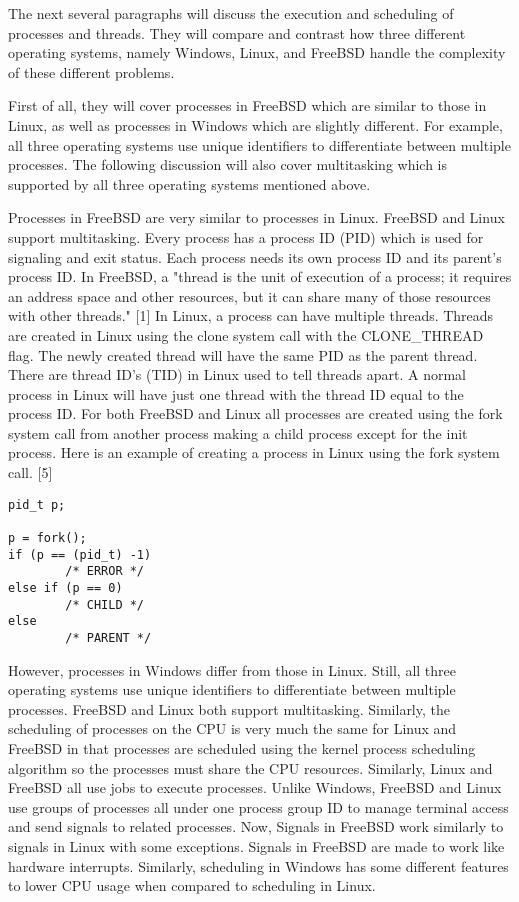 \documentclass[letterpaper,10pt,draftclsnofoot,onecolumn,]{IEEEtran}
\begin{document}

The next several paragraphs will discuss the execution and scheduling of processes and threads. They will compare and contrast how three different operating systems, namely Windows, Linux, and FreeBSD handle the complexity of these different problems. 

First of all, they will cover processes in FreeBSD which are similar to those in Linux, as well as processes in Windows which are slightly different. For example, all three operating systems use unique identifiers to differentiate between multiple processes. The following discussion will also cover multitasking which is supported by all three operating systems mentioned above.

Processes in FreeBSD are very similar to processes in Linux. FreeBSD and Linux support multitasking. Every process has a process ID (PID) which is used for signaling and exit status. Each process needs its own process ID and its parent's process ID. In FreeBSD, a "thread is the unit of execution of a process; it requires an address space and other resources, but it can share many of those resources with other threads." [1] In Linux, a process can have multiple threads. Threads are created in Linux using the clone system call with the CLONE\_THREAD flag. The newly created thread will have the same PID as the parent thread. There are thread ID's (TID) in Linux used to tell threads apart. A normal process in Linux will have just one thread with the thread ID equal to the process ID. For both FreeBSD and Linux all processes are created using the fork system call from another process making a child process except for the init process. Here is an example of creating a process in Linux using the fork system call. [5] 
\begin{lstlisting}
pid_t p;

p = fork();
if (p == (pid_t) -1)
        /* ERROR */
else if (p == 0)
        /* CHILD */
else
        /* PARENT */
\end{lstlisting}

However, processes in Windows differ from those in Linux. Still, all three operating systems use unique identifiers to differentiate between multiple processes. FreeBSD and Linux both support multitasking. Similarly, the scheduling of processes on the CPU is very much the same for Linux and FreeBSD in that processes are scheduled using the kernel process scheduling algorithm so the processes must share the CPU resources. Similarly, Linux and FreeBSD all use jobs to execute processes. Unlike Windows, FreeBSD and Linux use groups of processes all under one process group ID to manage terminal access and send signals to related processes. Now, Signals in FreeBSD work similarly to signals in Linux with some exceptions. Signals in FreeBSD are made to work like hardware interrupts. Similarly, scheduling in Windows has some different features to lower CPU usage when compared to scheduling in Linux.
\end{document}
